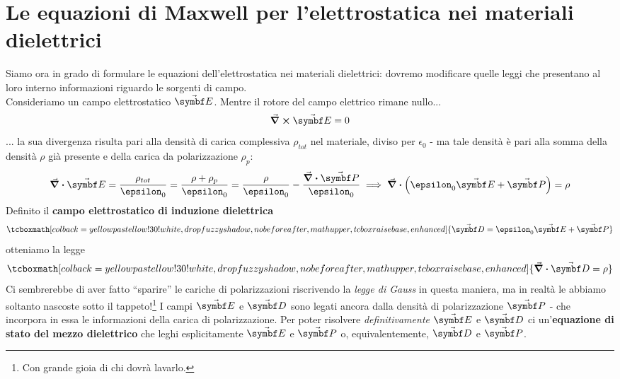\section{Le equazioni di Maxwell per l'elettrostatica nei materiali dielettrici}\label{EqMaxwellDielettrici}
Siamo ora in grado di formulare le equazioni dell'elettrostatica nei materiali dielettrici: dovremo modificare quelle leggi che presentano al loro interno informazioni riguardo le sorgenti di campo.\\
Consideriamo un campo elettrostatico $\vba{E}$. Mentre il rotore del campo elettrico rimane nullo...
\begin{equation}
	\curl{\vba{E}}=0
\end{equation}
... la sua divergenza risulta pari alla densità di carica complessiva $\rho_{tot}$ nel materiale, diviso per $\epsilon_0$ - ma tale densità è pari alla somma della densità $\rho$ già presente e della carica da polarizzazione $\rho_p$:
\begin{equation*}
	\div{\vba{E}}=\frac{\rho_{tot}}{\epsilon_0}=\frac{\rho+\rho_p}{\epsilon_0}=\frac{\rho}{\epsilon_0}-\frac{\div{\vba{P}}}{\epsilon_0}\implies \div{\left(\epsilon_0\vba{E}+\vba{P}\right)}=\rho
\end{equation*}
Definito il \textbf{campo elettrostatico di induzione dielettrica}
\begin{equation}
	\tcboxmath[colback=yellowpastellow!30!white,drop fuzzy shadow, nobeforeafter, math upper, tcbox raise base, enhanced]{\vba{D}=\epsilon_0\vba{E}+\vba{P}}
\end{equation}
otteniamo la legge
\begin{equation}
	\tcboxmath[colback=yellowpastellow!30!white,drop fuzzy shadow, nobeforeafter, math upper, tcbox raise base, enhanced]{\div{\vba{D}}=\rho}\label{SecondaMaxwellDIelettriciUno}
\end{equation}
Ci sembrerebbe di aver fatto ``sparire'' le cariche di polarizzazioni riscrivendo la \textit{legge di Gauss} in questa maniera, ma in realtà le abbiamo soltanto nascoste sotto il tappeto!\footnote{Con grande gioia di chi dovrà lavarlo.} I campi $\vba{E}$ e $\vba{D}$ sono legati ancora dalla densità di polarizzazione $\vba{P}$ - che incorpora in essa le informazioni della carica di polarizzazione. Per poter risolvere \textit{definitivamente} $\vba{E}$ e $\vba{D}$ ci un'\textbf{equazione di stato del mezzo dielettrico} che leghi esplicitamente $\vba{E}$ e $\vba{P}$ o, equivalentemente, $\vba{D}$ e $\vba{P}$.\\
